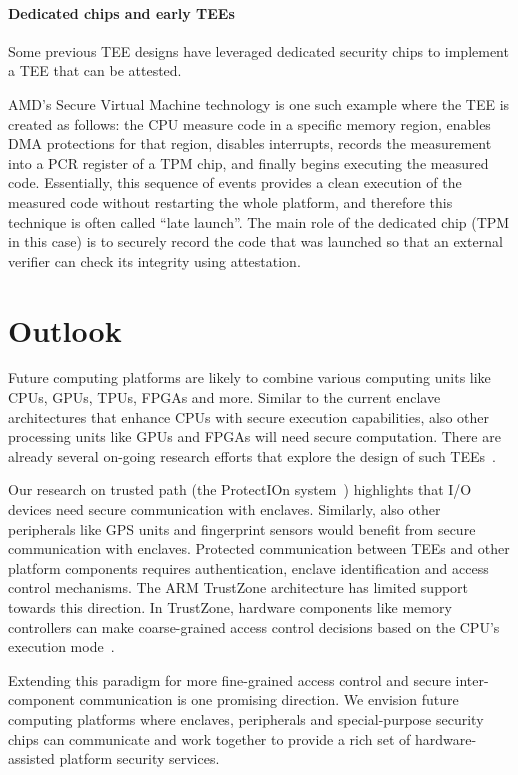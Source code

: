 \documentclass[letterpaper,twocolumn,10pt]{article}
\newcommand{\protection}{\textsf{ProtectIOn}\xspace}
\begin{document}
\paragraph{Dedicated chips and early TEEs}

Some previous TEE designs have leveraged dedicated security chips to implement a TEE that can be attested.

AMD's Secure Virtual Machine technology is one such example where the TEE is created as follows: the CPU measure code in a specific memory region, enables DMA protections for that region, disables interrupts, records the measurement into a PCR register of a TPM chip, and finally begins executing the measured code. Essentially, this sequence of events provides a clean execution of the measured code without restarting the whole platform, and therefore this technique is often called ``late launch''. The main role of the dedicated chip (TPM in this case) is to securely record the code that was launched so that an external verifier can check its integrity using attestation.


\section*{Outlook}

Future computing platforms are likely to combine various computing units like CPUs, GPUs, TPUs, FPGAs and more. 
Similar to the current enclave architectures that enhance CPUs with secure execution capabilities, also other processing units like GPUs and FPGAs will need secure computation. There are already several on-going research efforts that explore the design of such TEEs~\cite{volos2018graviton}.

Our research on trusted path (the \protection system~\cite{protection}) highlights that I/O devices need secure communication with enclaves. Similarly, also other peripherals like GPS units and fingerprint sensors would benefit from secure communication with enclaves. Protected communication between TEEs and other platform components requires authentication, enclave identification and access control mechanisms. The ARM TrustZone architecture has limited support towards this direction. In TrustZone, hardware components like memory controllers can make coarse-grained access control decisions based on the CPU's execution mode~\cite{ekberg2014untapped}. 

Extending this paradigm for more fine-grained access control and secure inter-component communication is one promising direction. We envision future computing platforms where enclaves, peripherals and special-purpose security chips can communicate and work together to provide a rich set of hardware-assisted platform security services.
\end{document}
